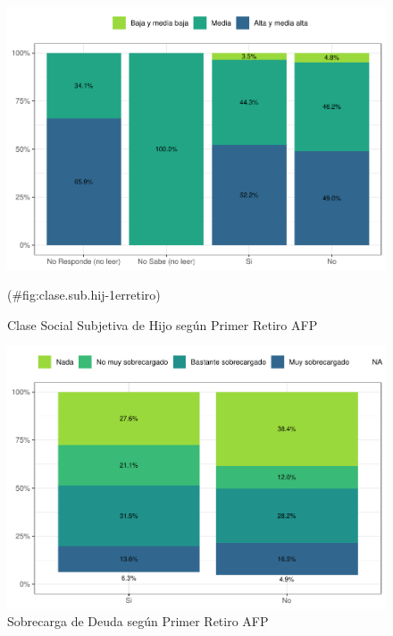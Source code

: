 \documentclass[
  12pt,
]{book}
\begin{document}
\begin{figure}

{\centering \includegraphics{reporte-elsoc_files/figure-latex/clase.sub.hij-1erretiro-1} 

}

\caption{Clase Social Subjetiva de Hijo según Primer Retiro AFP}(\#fig:clase.sub.hij-1erretiro)
\end{figure}

\begin{figure}

{\centering \includegraphics{reporte-elsoc_files/figure-latex/endeud-1retiro-1} 

}

\caption{Sobrecarga de Deuda según Primer Retiro AFP}\label{fig:endeud-1retiro}
\end{figure}
\end{document}
